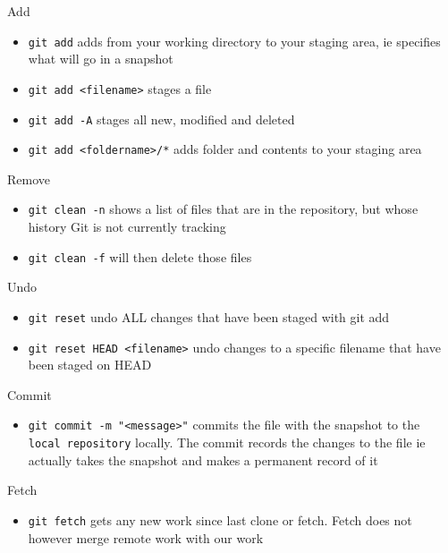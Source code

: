 \documentclass[
  12pt,
]{book}
\providecommand{\tightlist}{%
  \setlength{\itemsep}{0pt}\setlength{\parskip}{0pt}}
\begin{document}
Add

\begin{itemize}
\tightlist
\item
  \texttt{git\ add} adds from your working directory to your staging area, ie specifies what will go in a snapshot
\item
  \texttt{git\ add\ \textless{}filename\textgreater{}} stages a file
\item
  \texttt{git\ add\ -A} stages all new, modified and deleted
\item
  \texttt{git\ add\ \textless{}foldername\textgreater{}/*} adds folder and contents to your staging area
\end{itemize}

Remove

\begin{itemize}
\tightlist
\item
  \texttt{git\ clean\ -n} shows a list of files that are in the repository, but whose history Git is not currently tracking
\item
  \texttt{git\ clean\ -f} will then delete those files
\end{itemize}

Undo

\begin{itemize}
\tightlist
\item
  \texttt{git\ reset} undo ALL changes that have been staged with git add
\item
  \texttt{git\ reset\ HEAD\ \textless{}filename\textgreater{}} undo changes to a specific filename that have been staged on HEAD
\end{itemize}

Commit

\begin{itemize}
\tightlist
\item
  \texttt{git\ commit\ -m\ "\textless{}message\textgreater{}"} commits the file with the snapshot to the \texttt{local\ repository} locally. The commit records the changes to the file ie actually takes the snapshot and makes a permanent record of it
\end{itemize}

Fetch

\begin{itemize}
\tightlist
\item
  \texttt{git\ fetch} gets any new work since last clone or fetch. Fetch does not however merge remote work with our work
\end{itemize}
\end{document}
